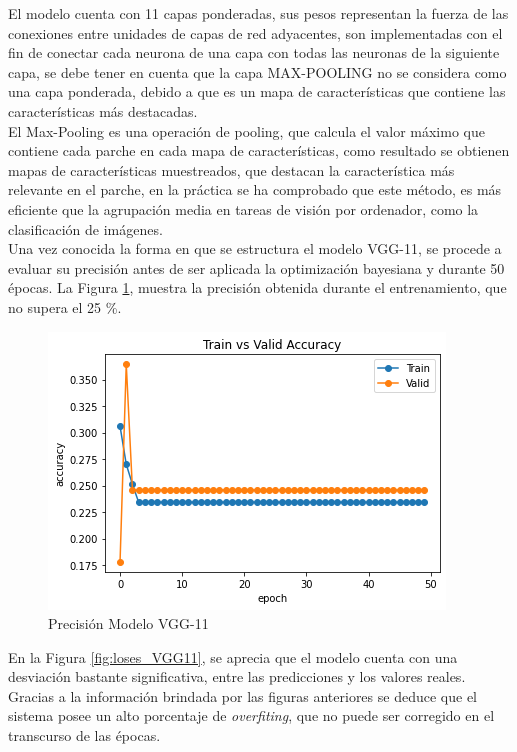 El modelo cuenta con 11 capas ponderadas, sus pesos representan la fuerza de las conexiones entre unidades de capas de red adyacentes, son implementadas con el fin de conectar cada neurona de una capa con todas las neuronas de la siguiente capa, se debe tener en cuenta que la capa MAX-POOLING no se considera como una capa ponderada, debido a que es un mapa de características que contiene las características más destacadas.\\

El Max-Pooling es una operación de pooling, que calcula el valor máximo que contiene cada parche en cada mapa de características, como resultado se obtienen mapas de características muestreados, que destacan la característica más relevante en el parche, en la práctica se ha comprobado que este método, es más eficiente que la agrupación media en tareas de visión por ordenador, como la clasificación de imágenes.\\		 


Una vez conocida la forma en que se estructura el modelo VGG-11, se procede a evaluar su precisión antes de ser aplicada la optimización bayesiana y durante 50 épocas. La Figura \ref{fig:precision_VGG11}, muestra la precisión obtenida durante el entrenamiento, que no supera el 25 \%.


\begin{figure}[ht]
	\centering
	\includegraphics[scale=0.5]{Figs/105.png}
	\caption{Precisión Modelo VGG-11}
	\label{fig:precision_VGG11}
\end{figure}

En la Figura \ref{fig:loses_VGG11}, se aprecia que el modelo cuenta con una desviación bastante significativa, entre las predicciones y los valores reales. Gracias a la información brindada por las figuras anteriores se deduce que el sistema posee un alto porcentaje de \textit{overfiting}, que no puede ser corregido en el transcurso de las épocas.


